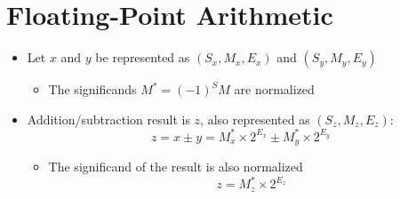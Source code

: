 \documentclass[12pt,openany, tikz,border=10pt]{book}
\begin{document}
\section{Floating-Point Arithmetic}

    
    
    \begin{itemize}
      \item[] Let \( x \) and \( y \) be represented as \( (S_x, M_x, E_x) \) and \( (S_y, M_y, E_y) \)
      \begin{itemize}
        \item[] The significands \( M^* = (-1)^S M \) are normalized
      \end{itemize}
      
      \item[] Addition/subtraction result is \( z \), also represented as \( (S_z, M_z, E_z) \):
      \[ z = x \pm y = M^*_x \times 2^{E_x} \pm M^*_y \times 2^{E_y} \]
      
      \begin{itemize}
        \item[] The significand of the result is also normalized
        \[ z = M^*_z \times 2^{E_z} \]
      \end{itemize}
    \end{itemize}
    
\end{document}
